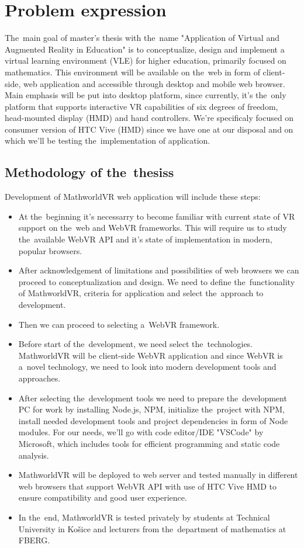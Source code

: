 \section{Problem expression}
The~main goal of master's thesis with the~name "Application of Virtual and Augmented Reality in Education" is to conceptualize, design and implement a virtual learning environment (VLE) for higher education, primarily focused on mathematics. This environment will be available on the~web in form of client-side, web application and accessible through desktop and mobile web browser. Main emphasis will be put into desktop platform, since currently, it's the~only platform that supports interactive VR capabilities of six degrees of freedom, head-mounted display (HMD) and hand controllers. We're specificaly focused on consumer version of HTC Vive (HMD) since we have one at our disposal and on which we'll be testing the~implementation of application.

\subsection{Methodology of the~thesiss}
Development of MathworldVR web application will include these steps:
\begin{itemize}
\item{At the~beginning it's necessarry to become familiar with current state of VR support on the~web and WebVR frameworks. This will require us to study the~available WebVR API and it's state of implementation in modern, popular browsers.}
\item{After acknowledgement of limitations and possibilities of web browsers we can proceed to conceptualization and design. We need to define the~functionality of MathworldVR, criteria for application and select the~approach to development.}
\item{Then we can proceed to selecting a~WebVR framework.}
\item{Before start of the~development, we need select the~technologies. MathworldVR will be client-side WebVR application and since WebVR is a~novel technology, we need to look into modern development tools and approaches.}
\item{After selecting the~development tools we need to prepare the~development PC for work by installing Node.js, NPM, initialize the~project with NPM, install needed development tools and project dependencies in form of Node modules. For our needs, we'll go with code editor/IDE "VSCode" by Microsoft, which includes tools for efficient programming and static code analysis.}
\item{MathworldVR will be deployed to web server and tested manually in different web browsers that support WebVR API with use of HTC Vive HMD to ensure compatibility and good user experience.}
\item{In the~end, MathworldVR is tested privately by students at Technical University in Košice and lecturers from the~department of mathematics at FBERG.}
\end{itemize}
